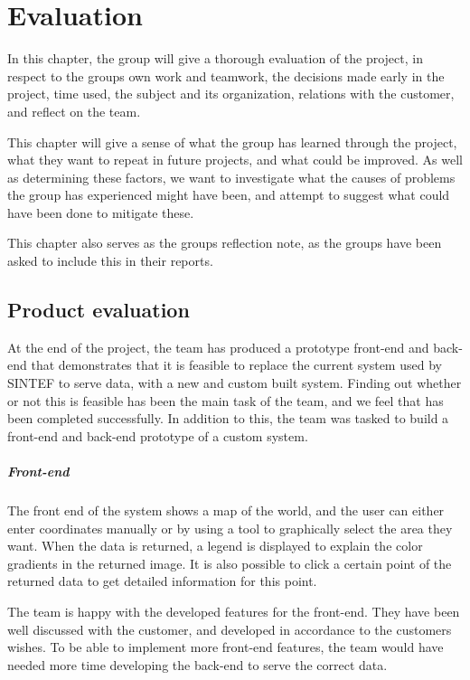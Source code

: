 \documentclass[11pt,a4paper,titlepage,oneside]{report}
\begin{document}
\chapter{Evaluation}
In this chapter, the group will give a thorough evaluation of the project, in respect to the groups own work and teamwork, the decisions made early in the project, time used, the subject and its organization, relations with the customer, and reflect on the team. 

This chapter will give a sense of what the group has learned through the project, what they want to repeat in future projects, and what could be improved. As well as determining these factors, we want to investigate what the causes of problems the group has experienced might have been, and attempt to suggest what could have been done to mitigate these. 

This chapter also serves as the groups reflection note, as the groups have been asked to include this in their reports. 

\section{Product evaluation}
At the end of the project, the team has produced a \gls{prototype} \gls{front-end} and \gls{back-end} that demonstrates that it is feasible to replace the current system used by SINTEF to serve data, with a new and custom built system. Finding out whether or not this is feasible has been the main task of the team, and we feel that has been completed successfully. In addition to this, the team was tasked to build a front-end and back-end prototype of a custom system.

\paragraph{Front-end}
The front end of the system shows a map of the world, and the user can either enter coordinates manually or by using a tool to graphically select the area they want. When the data is returned, a legend is displayed to explain the color gradients in the returned image. It is also possible to click a certain point of the returned data to get detailed information for this point.

The team is happy with the developed features for the \gls{front-end}. They have been well discussed with the customer, and developed in accordance to the customers wishes. To be able to implement more \gls{front-end} features, the team would have needed more time developing the \gls{back-end} to serve the correct data. 
\end{document}
